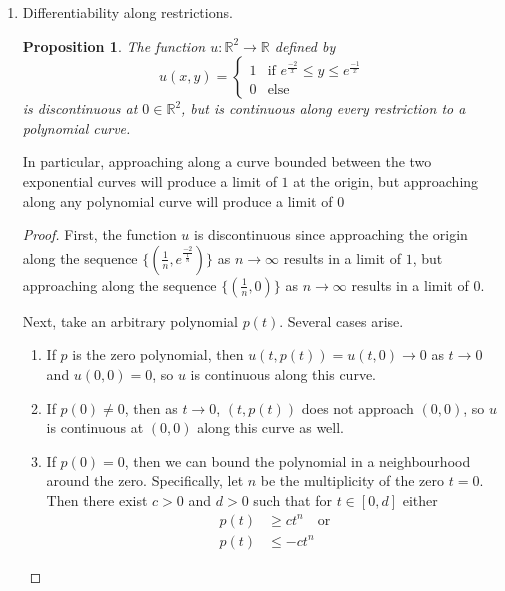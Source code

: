 \documentclass[letterpaper,11pt]{article}
\newtheorem{prop}{Proposition}
\newcommand{\R}{\mathbb{R}}
\begin{document}
\begin{enumerate}
    \item Differentiability along restrictions.

        \begin{prop}
            The function $u : \R^2 \to \R$ defined by
            \begin{equation*}
                u(x, y) = \begin{cases}
                    1 &\mbox{if } e^\frac{-2}{x} \leq y \leq e^\frac{-1}{x} \\
                    0 &\mbox{else}
                \end{cases}
            \end{equation*}
            is discontinuous at $0 \in \R^2$, but is continuous along every
            restriction to a polynomial curve.
        \end{prop}

        In particular, approaching along a curve bounded between the two
        exponential curves will produce a limit of $1$ at the origin, but
        approaching along any polynomial curve will produce a limit of $0$

        \begin{proof}
            First, the function $u$ is discontinuous since approaching the
            origin along the sequence
            $\{(\frac{1}{n}, e^\frac{-2}{\frac{1}{n}})\}$ as $n \to \infty$
            results in a limit of $1$, but approaching along the sequence
            $\{(\frac{1}{n}, 0)\}$ as $n \to \infty$ results in a limit of $0$.

            Next, take an arbitrary polynomial $p(t)$. Several cases arise.
            \begin{enumerate}
                \item If $p$ is the zero polynomial, then
                    $u(t, p(t)) = u(t, 0) \to 0$ as
                    $t \to 0$ and $u(0, 0) = 0$, so $u$ is continuous along
                    this curve.

                \item If $p(0) \neq 0$, then as $t \to 0$, $(t, p(t))$ does not
                    approach $(0, 0)$, so $u$ is continuous at $(0, 0)$ along
                    this curve as well.

                \item If $p(0) = 0$, then we can bound the polynomial in a
                    neighbourhood around the zero. Specifically, let $n$ be the
                    multiplicity of the zero $t = 0$. Then there exist $c > 0$
                    and $d > 0$ such that for $t \in [0, d]$ either
                    \begin{align*}
                        p(t) &\geq ct^n \quad \text{or}\\
                        p(t) &\leq -ct^n
                    \end{align*}


\end{enumerate}
\end{proof}
\end{enumerate}
\end{document}
